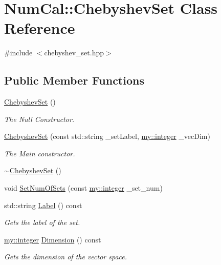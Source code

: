 \hypertarget{classNumCal_1_1ChebyshevSet}{\section{Num\+Cal\+:\+:Chebyshev\+Set Class Reference}
\label{classNumCal_1_1ChebyshevSet}
}


{\ttfamily \#include $<$chebyshev\+\_\+set.\+hpp$>$}

\subsection*{Public Member Functions}
\begin{DoxyCompactItemize}
\item 
\hyperlink{classNumCal_1_1ChebyshevSet_add89be1a33c1617e41e941d1f5e2c7c9}{Chebyshev\+Set} ()
\begin{DoxyCompactList}\small\item\em The Null Constructor. \end{DoxyCompactList}\item 
\hyperlink{classNumCal_1_1ChebyshevSet_aa16001d1c72565f061b2658d8c513a7d}{Chebyshev\+Set} (const std\+::string \+\_\+set\+Label, \hyperlink{namespacemy_a42365393c537edae1e89d20ff90d1923}{my\+::integer} \+\_\+vec\+Dim)
\begin{DoxyCompactList}\small\item\em The Main constructor. \end{DoxyCompactList}\item 
\hyperlink{classNumCal_1_1ChebyshevSet_a084680552a47439398c938e7965cb5db}{$\sim$\+Chebyshev\+Set} ()
\item 
void \hyperlink{classNumCal_1_1ChebyshevSet_ae041ef43a4ef539403c3205d7dbb07db}{Set\+Num\+Of\+Sets} (const \hyperlink{namespacemy_a42365393c537edae1e89d20ff90d1923}{my\+::integer} \+\_\+set\+\_\+num)
\item 
std\+::string \hyperlink{classNumCal_1_1ChebyshevSet_af4b6d26460aa678519a7678caf322003}{Label} () const 
\begin{DoxyCompactList}\small\item\em Gets the label of the set. \end{DoxyCompactList}\item 
\hyperlink{namespacemy_a42365393c537edae1e89d20ff90d1923}{my\+::integer} \hyperlink{classNumCal_1_1ChebyshevSet_abcf6cbf670bd2768adc8f35b4b44bcf8}{Dimension} () const 
\begin{DoxyCompactList}\small\item\em Gets the dimension of the vector space. \end{DoxyCompactList}\item 

\end{DoxyCompactItemize}
